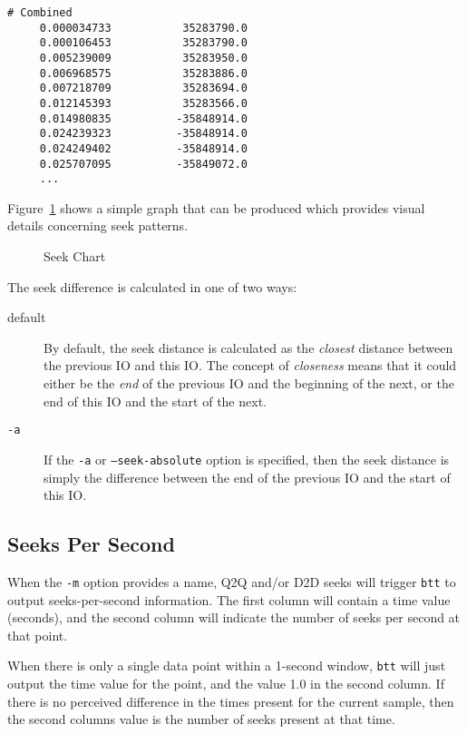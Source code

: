 \documentclass{article}
\begin{document}
\begin{verbatim}
# Combined
     0.000034733           35283790.0
     0.000106453           35283790.0
     0.005239009           35283950.0
     0.006968575           35283886.0
     0.007218709           35283694.0
     0.012145393           35283566.0
     0.014980835          -35848914.0
     0.024239323          -35848914.0
     0.024249402          -35848914.0
     0.025707095          -35849072.0
     ...
\end{verbatim}

  Figure~\ref{fig:seek} shows a simple graph that can be produced which
  provides visual details concerning seek patterns.

  \begin{figure}[h!]
  \leavevmode\centering
  \caption{\label{fig:seek}Seek Chart}
  \end{figure}
  \FloatBarrier

  The seek difference is calculated in one of two ways:

  \begin{description}
    \item[default] By default, the seek distance is calculated as the
    \emph{closest} distance between the previous IO and this IO. The
    concept of \emph{closeness} means that it could either be the
    \emph{end} of the previous IO and the beginning of the next, or the
    end of this IO and the start of the next.

    \item[\texttt{-a}] If the \texttt{-a} or \texttt{--seek-absolute}
    option is specified, then the seek distance is simply the difference
    between the end of the previous IO and the start of this IO.
  \end{description}

\newpage\subsection{\label{sec:sps-spec}Seeks Per Second}

  When the \texttt{-m} option provides a name, Q2Q and/or D2D seeks
  will trigger \texttt{btt} to output seeks-per-second information. The
  first column will contain a time value (seconds), and the second column
  will indicate the number of seeks per second at that point.

  When there is only a single data point within a 1-second window,
  \texttt{btt} will just output the time value for the point, and the
  value 1.0 in the second column. If there is no perceived difference
  in the times present for the current sample, then the second columns
  value is the number of seeks present at that time.
\end{document}
